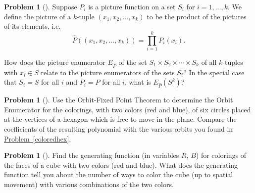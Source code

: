 \documentclass[10pt,]{book}
\theoremstyle{plain}
\theoremstyle{definition}
\newtheorem{activity}[project]{Problem}
\theoremstyle{definition}
\numberwithin{equation}{chapter}
\begin{document}
\begin{activity}[] \label{PictureEnumeratorforFunctions}
\hypertarget{p-1748}{}%
Suppose \(P_i\) is a picture function on a set \(S_i\) for \(i=1,\dots,k\). We define the picture of a \(k\)-tuple \((x_1,x_2,\dots,x_k)\) to be the product of the pictures of its elements, i.e.\@%
\begin{equation*}
\widehat P((x_1,x_2,\dots,x_k)) = \prod_{i=1}^k P_i(x_i).
\end{equation*}
%
\par
\hypertarget{p-1749}{}%
How does the picture enumerator \(E_{\widehat P}\) of the set \(S_1\times S_2\times\cdots\times S_k\) of all \(k\)-tuples with \(x_i\in S\) relate to the picture enumerators of the sets \(S_i\)? In the special case that \(S_i = S\) for all \(i\) and \(P_i = P\) for all \(i\), what is \(E_{\widehat{P}}(S^k)\)?%
\end{activity}
\begin{activity}[] \label{polya1}
\hypertarget{p-1751}{}%
Use the Orbit-Fixed Point Theorem to determine the Orbit Enumerator for the colorings, with two colors (red and blue), of six circles placed at the vertices of a hexagon which is free to move in the plane. Compare the coefficients of the resulting polynomial with the various orbits you found in \hyperref[coloredhex]{Problem~\ref{coloredhex}}.%
\end{activity}
\begin{activity}[]\marginsymbol[-1em]{} \label{polya2}
\hypertarget{p-1756}{}%
Find the generating function (in variables \(R\), \(B\)) for colorings of the faces of a cube with two colors (red and blue). What does the generating function tell you about the number of ways to color the cube (up to spatial movement) with various combinations of the two colors.%
\end{activity}
\typeout{************************************************}
\typeout{************************************************}
\end{document}
